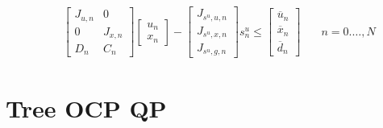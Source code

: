 \documentclass[a4paper]{report}
\begin{document}
\begin{align*}
& \quad \begin{bmatrix} J_{u,n} & 0 \\ 0 & J_{x,n} \\ D_n & C_n \end{bmatrix} \begin{bmatrix} u_n \\ x_n \end{bmatrix} - \begin{bmatrix} J_{s^u,u,n} \\ J_{s^u,x,n} \\ J_{s^u,g,n} \end{bmatrix} s^u_n \leq \begin{bmatrix} \overline u_n \\ \overline x_n \\ \overline d_n \end{bmatrix} & \quad n=0.\dots,N
\end{align*}



\chapter{Tree OCP QP}
\end{document}
